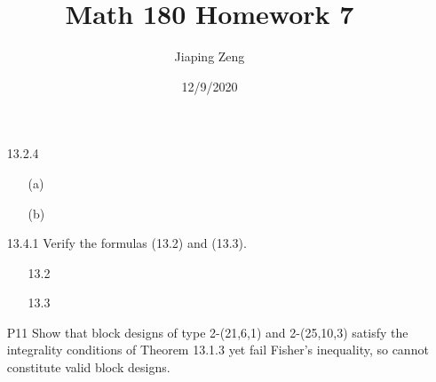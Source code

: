 \documentclass{article}
\title{Math 180 Homework 7}
\date{12/9/2020}
\author{Jiaping Zeng}
\begin{document}
\maketitle

\begin{itemize}
    \item [13.2.4]
          \begin{itemize}
              \item [(a)]
              \item [(b)]
          \end{itemize}
    \item [13.4.1] Verify the formulas (13.2) and (13.3).
          \begin{itemize}
              \item [13.2]
              \item [13.3]
          \end{itemize}
    \item [P11] Show that block designs of type 2-(21,6,1) and 2-(25,10,3) satisfy the integrality conditions of Theorem 13.1.3 yet fail Fisher's inequality, so cannot constitute valid block designs.
\end{itemize}
\end{document}

